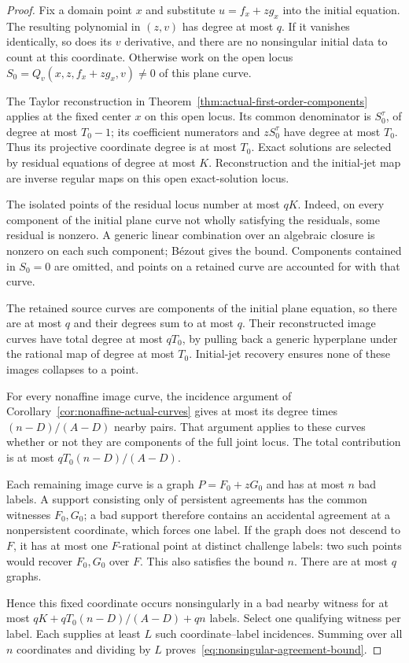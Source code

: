 \begin{proof}
Fix a domain point $x$ and substitute $u=f_x+zg_x$ into the initial
equation. The resulting polynomial in $(z,v)$ has degree at most $q$.
If it vanishes identically, so does its $v$ derivative, and there
are no nonsingular initial data to count at this coordinate.
Otherwise work on the open locus
$S_0=Q_v(x,z,f_x+zg_x,v)\ne0$ of this plane curve.

The Taylor reconstruction in
Theorem~\ref{thm:actual-first-order-components} applies at the fixed
center $x$ on this open locus. Its common denominator is $S_0^\tau$,
of degree at most $T_0-1$; its coefficient numerators and $zS_0^\tau$
have degree at most $T_0$. Thus its projective coordinate degree is
at most $T_0$. Exact solutions are selected by residual equations
of degree at most $K$. Reconstruction and the initial-jet map are
inverse regular maps on this open exact-solution locus.

The isolated points of the residual locus number at most $qK$.
Indeed, on every component of the initial plane curve not wholly
satisfying the residuals, some residual is nonzero. A generic linear
combination over an algebraic closure is nonzero on each such component;
B\'ezout gives the bound. Components contained in $S_0=0$ are omitted,
and points on a retained curve are accounted for with that curve.

The retained source curves are components of the initial plane
equation, so there are at most $q$ and their degrees sum to at most
$q$. Their reconstructed image curves have total degree at most
$qT_0$, by pulling back a generic hyperplane under the rational map
of degree at most $T_0$. Initial-jet recovery ensures none of these
images collapses to a point.

For every nonaffine image curve, the incidence argument of
Corollary~\ref{cor:nonaffine-actual-curves} gives at most its degree
times $(n-D)/(A-D)$ nearby pairs. That argument applies to these
curves whether or not they are components of the full joint locus.
The total contribution is at most $qT_0(n-D)/(A-D)$.

Each remaining image curve is a graph $P=F_0+zG_0$ and has at most
$n$ bad labels. A support consisting only of persistent agreements
has the common witnesses $F_0,G_0$; a bad support therefore contains
an accidental agreement at a nonpersistent coordinate, which forces
one label. If the graph does not descend to $F$, it has at most one
$F$-rational point at distinct challenge labels: two such points
would recover $F_0,G_0$ over $F$. This also satisfies the bound $n$.
There are at most $q$ graphs.

Hence this fixed coordinate occurs nonsingularly in a bad nearby
witness for at most $qK+qT_0(n-D)/(A-D)+qn$ labels. Select one
qualifying witness per label. Each supplies at least $L$ such
coordinate--label incidences. Summing over all $n$ coordinates and
dividing by $L$ proves~\eqref{eq:nonsingular-agreement-bound}.
\end{proof}

